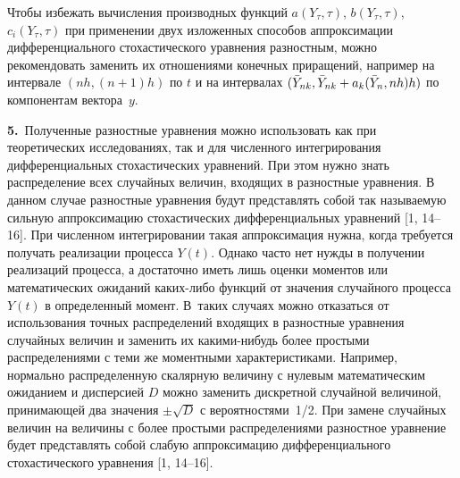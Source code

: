 {Чтобы избежать вычисления производных
функций $a(Y_{\tau},\tau)$, $b(Y_{\tau},\tau)$, $c_i(Y_{\tau},\tau)$ при
применении двух изложенных способов аппроксимации дифференциального стохастического
уравнения разностным, можно рекомендовать заменить
их отношениями конечных приращений, например на интервале
$(nh,(n+1)h)$ по $t$ и на интервалах $(\bar Y_{nk}, \bar
Y_{nk}\hm+a_k(\bar Y_n,nh)h)$ по компонентам вектора~$y$.

\textbf{5.}\ Полученные разностные уравнения можно использовать как при
теоретических исследованиях, так и для чис\-лен\-но\-го интегрирования
дифференциальных стохастических уравнений. При этом нужно знать
распределение всех случайных величин, входящих в разностные уравнения.
В данном случае разностные уравнения будут представлять собой так называемую
 сильную аппроксимацию стохастических дифференциальных уравнений [1, 14--16].
При численном интегрировании такая аппроксимация нужна, когда требуется
получать реализации процесса $Y(t)$. Однако часто нет
нужды в получении реализаций процесса, а достаточно иметь лишь
оценки моментов или математических ожиданий каких-либо функций от значения
случайного процесса $Y(t)$ в определенный момент. В~таких случаях можно
отказаться от использования точных распределений входящих в разностные
уравнения случайных величин и заменить их ка\-ки\-ми-ни\-будь более
простыми распределениями с теми же моментными характеристиками.
Например, нормально распределенную скалярную величину с нулевым
математическим ожиданием и дисперсией $D$ можно заменить дискретной
случайной величиной, принимающей два значения $\pm\sqrt{D}$ с
вероятностями~1/2. При замене случайных величин на величины с
более простыми распределениями разностное уравнение будет представлять
собой слабую аппроксимацию дифференциального стохастического
уравнения [1, 14--16].

}



\renewcommand{\theequation}{\arabic{equation}}

\vspace*{4mm}



